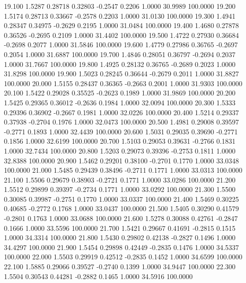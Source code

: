   19.100   1.5287   0.28718   0.32803  -0.2547   0.2206   1.0000  30.9989 100.0000
  19.200   1.5174   0.28713   0.33667  -0.2578   0.2203   1.0000  31.0130 100.0000
  19.300   1.4941   0.28347   0.34975  -0.2629   0.2195   1.0000  31.0484 100.0000
  19.400   1.4680   0.27878   0.36526  -0.2695   0.2109   1.0000  31.4402 100.0000
  19.500   1.4722   0.27930   0.36684  -0.2698   0.2077   1.0000  31.5846 100.0000
  19.600   1.4779   0.27986   0.36765  -0.2697   0.2054   1.0000  31.6887 100.0000
  19.700   1.4846   0.28051   0.36797  -0.2694   0.2037   1.0000  31.7667 100.0000
  19.800   1.4925   0.28132   0.36765  -0.2689   0.2023   1.0000  31.8298 100.0000
  19.900   1.5023   0.28245   0.36644  -0.2679   0.2011   1.0000  31.8827 100.0000
  20.000   1.5155   0.28437   0.36365  -0.2663   0.2001   1.0000  31.9303 100.0000
  20.100   1.5422   0.29028   0.35525  -0.2623   0.1989   1.0000  31.9869 100.0000
  20.200   1.5425   0.29365   0.36012  -0.2636   0.1984   1.0000  32.0094 100.0000
  20.300   1.5333   0.29396   0.36902  -0.2667   0.1981   1.0000  32.0226 100.0000
  20.400   1.5214   0.29337   0.37938  -0.2704   0.1976   1.0000  32.0473 100.0000
  20.500   1.4981   0.29008   0.39597  -0.2771   0.1893   1.0000  32.4439 100.0000
  20.600   1.5031   0.29035   0.39690  -0.2771   0.1856   1.0000  32.6199 100.0000
  20.700   1.5103   0.29053   0.39631  -0.2766   0.1831   1.0000  32.7434 100.0000
  20.800   1.5203   0.29073   0.39396  -0.2753   0.1811   1.0000  32.8388 100.0000
  20.900   1.5462   0.29201   0.38100  -0.2701   0.1770   1.0000  33.0348 100.0000
  21.000   1.5485   0.29439   0.38496  -0.2711   0.1771   1.0000  33.0313 100.0000
  21.100   1.5506   0.29679   0.38903  -0.2721   0.1771   1.0000  33.0286 100.0000
  21.200   1.5512   0.29899   0.39397  -0.2734   0.1771   1.0000  33.0292 100.0000
  21.300   1.5500   0.30085   0.39987  -0.2751   0.1770   1.0000  33.0337 100.0000
  21.400   1.5469   0.30225   0.40685  -0.2772   0.1768   1.0000  33.0437 100.0000
  21.500   1.5405   0.30290   0.41579  -0.2801   0.1763   1.0000  33.0688 100.0000
  21.600   1.5278   0.30088   0.42761  -0.2847   0.1666   1.0000  33.5596 100.0000
  21.700   1.5421   0.29667   0.41691  -0.2815   0.1515   1.0000  34.3314 100.0000
  21.800   1.5430   0.29802   0.42138  -0.2827   0.1496   1.0000  34.4297 100.0000
  21.900   1.5454   0.29898   0.42449  -0.2835   0.1476   1.0000  34.5337 100.0000
  22.000   1.5503   0.29919   0.42512  -0.2835   0.1452   1.0000  34.6599 100.0000
  22.100   1.5885   0.29066   0.39527  -0.2740   0.1399   1.0000  34.9447 100.0000
  22.300   1.5504   0.30543   0.44281  -0.2882   0.1465   1.0000  34.5916 100.0000
